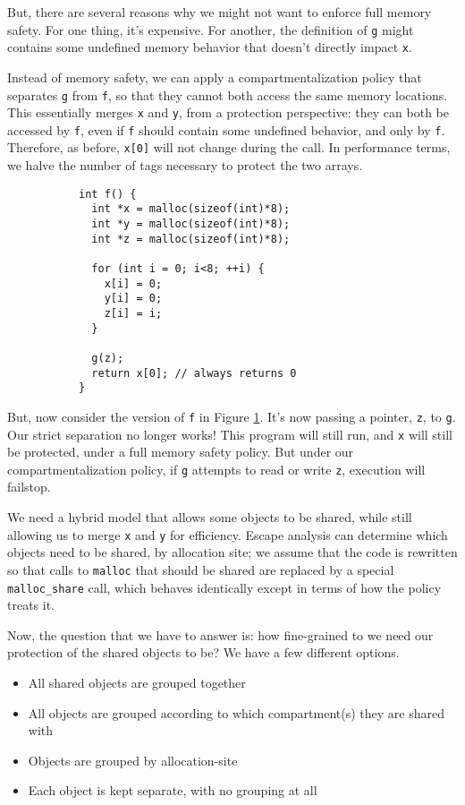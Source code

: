 \documentclass{article}
\begin{document}
But, there are several reasons why we might not want to enforce full memory safety.
For one thing, it's expensive. For another, the definition of {\tt g} might
contains some undefined memory behavior that doesn't directly impact {\tt x}.

Instead of memory safety, we can apply a compartmentalization policy that separates {\tt g}
from {\tt f}, so that they cannot both access the same memory locations. This essentially
merges {\tt x} and {\tt y}, from a protection perspective: they can both be accessed by {\tt f},
even if {\tt f} should contain some undefined behavior, and only by {\tt f}.
Therefore, as before, {\tt x[0]} will not change during the call.
In performance terms, we halve the number of tags necessary to protect the two arrays.

\begin{figure}
  \begin{subfigure}{0.5\textwidth}
\begin{verbatim}
int f() {
  int *x = malloc(sizeof(int)*8);
  int *y = malloc(sizeof(int)*8);
  int *z = malloc(sizeof(int)*8);

  for (int i = 0; i<8; ++i) {
    x[i] = 0;
    y[i] = 0;
    z[i] = i;
  }

  g(z);
  return x[0]; // always returns 0
}
\end{verbatim}
  \end{subfigure}
  
\caption{}
\label{fig:share}
\end{figure}

But, now consider the version of {\tt f} in Figure \ref{fig:share}. It's now passing a pointer,
{\tt z}, to {\tt g}. Our strict separation no longer works! This program will still run, and
{\tt x} will still be protected, under a full memory safety policy. But under our compartmentalization
policy, if {\tt g} attempts to read or write {\tt z}, execution will failstop.

We need a hybrid model that allows some objects to be shared, while still allowing us to merge
{\tt x} and {\tt y} for efficiency. Escape analysis can determine which objects need to be shared,
by allocation site; we assume that the code is rewritten so that calls to {\tt malloc} that should
be shared are replaced by a special {\tt malloc\_share} call, which behaves identically except
in terms of how the policy treats it.

Now, the question that we have to answer is: how fine-grained to we need our protection of the
shared objects to be? We have a few different options.
\begin{itemize}
\item All shared objects are grouped together
\item All objects are grouped according to which compartment(s) they are shared with
\item Objects are grouped by allocation-site
\item Each object is kept separate, with no grouping at all
\end{itemize}
\end{document}
